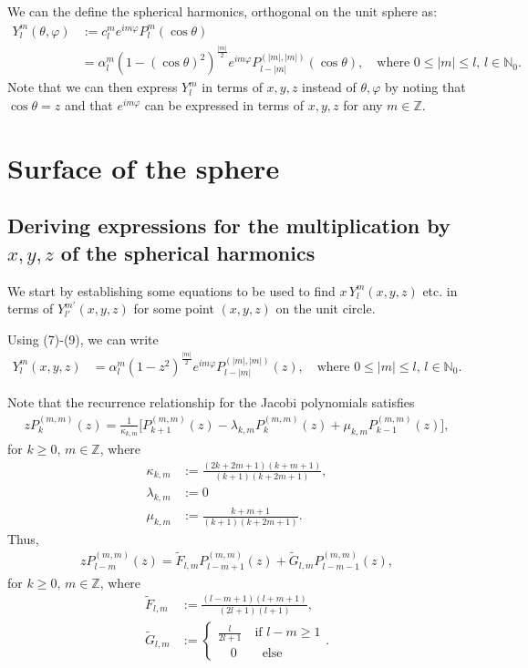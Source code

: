 \documentclass[11pt, oneside]{article}   	%
\newcommand{\Z}{\mathbb{Z}}
\newcommand{\No}{\mathbb{N}_0}
\newcommand{\Ylm}{Y^m_l}
\newcommand{\Ylmfull}{Y^m_l(\theta,\varphi)}
\newcommand{\Plm}{P^m_l}
\newcommand{\costheta}{\cos\theta}
\newcommand{\eimphi}{e^{im\varphi}}
\newcommand{\alphalm}{\alpha^m_l}
\newcommand{\clm}{c^m_l}
\newcommand{\Ftilde}{\tilde{F}_{l,m}}
\newcommand{\Gtilde}{\tilde{G}_{l,m}}
\begin{document}
We can the define the spherical harmonics, orthogonal on the unit sphere as:
\begin{align}
\Ylmfull &:= \clm \eimphi \Plm (\costheta) \\
&= \alphalm (1 - (\costheta)^2)^\frac{|m|}{2} \eimphi P^{(|m|,|m|)}_{l-|m|}(\costheta), \quad \text{where } 0 \le |m| \le l, \, l \in \No.
\end{align} 
Note that we can then express \(\Ylm\) in terms of \(x,y,z\) instead of \(\theta, \varphi\) by noting that \(\costheta = z\) and that \( \eimphi\) can be expressed in terms of \(x,y,z\) for any \(m\in\mathbb{Z}\).



\section{Surface of the sphere}

\subsection{Deriving expressions for the multiplication by \(x, y, z\) of the spherical harmonics}

We start by establishing some equations to be used to find \(x\,\Ylm(x,y,z)\) etc. in terms of \(Y^{m'}_{l'}(x,y,z)\) for some point \((x,y,z)\) on the unit circle.

Using (7)-(9), we can write
\begin{align}
\Ylm(x,y,z) &= \alphalm (1 - z^2)^\frac{|m|}{2} \eimphi P^{(|m|,|m|)}_{l-|m|}(z), \quad \text{where } 0 \le |m| \le l, \, l \in \No.
\end{align}

Note that the recurrence relationship for the Jacobi polynomials satisfies
\begin{align}
z P^{(m,m)}_k(z) = \frac{1}{\kappa_{k,m}} \big[ P^{(m,m)}_{k+1}(z) - \lambda_{k,m} P^{(m,m)}_k(z) + \mu_{k,m} P^{(m,m)}_{k-1}(z) \big],
\end{align}
for \(k\ge0, \, m\in\Z\), where
\begin{align}
\kappa_{k,m} &:= \frac{(2k+2m+1)(k+m+1)}{(k+1)(k+2m+1)}, \\
\lambda_{k,m} &:= 0\\
\mu_{k,m} &:= \frac{k+m+1}{(k+1)(k+2m+1)}.
\end{align}
Thus,
\begin{align}
z P^{(m,m)}_{l-m}(z) = \Ftilde P^{(m,m)}_{l-m+1}(z) + \Gtilde P^{(m,m)}_{l-m-1}(z),
\end{align}
for \(k\ge0, \, m\in\Z\), where
\begin{align}
\Ftilde &:= \frac{(l-m+1)(l+m+1)}{(2l+1)(l+1)}, \\
\Gtilde &:= \begin{cases}
			\frac{l}{2l+1} \quad \text{if } l - m \ge 1 \\
			\quad 0 \quad \quad \text{else}
		\end{cases} .
\end{align}
\end{document}
